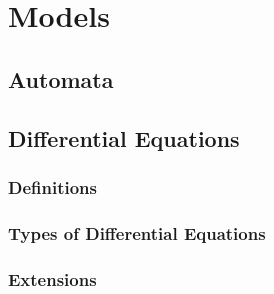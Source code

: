 \chapter{Models}\label{models}

    \section{Automata}
    
    \section{Differential Equations}
        \subsection{Definitions}
        
        \subsection{Types of Differential Equations}
        
        \subsection{Extensions}\label{de_ext}
